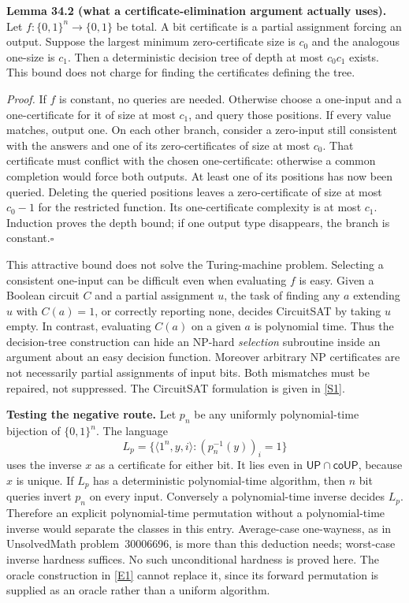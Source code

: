 \documentclass[11pt,a4paper]{article}
\newcommand{\sref}[2]{\hyperlink{source:#1:#2}{[S#2]}}
\newcommand{\eref}[2]{\hyperlink{extra:#1:#2}{[E#2]}}
\numberwithin{equation}{section}
\begin{document}
\textbf{Lemma 34.2 (what a certificate-elimination argument actually uses).}
Let $f:\{0,1\}^n\to\{0,1\}$ be total. A bit certificate is a partial
assignment forcing an output. Suppose the largest minimum zero-certificate
size is $c_0$ and the analogous one-size is $c_1$. Then a deterministic
decision tree of depth at most $c_0c_1$ exists. This bound does not charge for
finding the certificates defining the tree.

\emph{Proof.} If $f$ is constant, no queries are needed. Otherwise choose
a one-input and a one-certificate for it of size at most $c_1$, and query
those positions. If every value matches, output one. On each other branch,
consider a zero-input still consistent with the answers and one of its
zero-certificates of size at most $c_0$. That certificate must conflict with
the chosen one-certificate: otherwise a common completion would force both
outputs. At least one of its positions has now been queried. Deleting the
queried positions leaves a zero-certificate of size at most $c_0-1$ for the
restricted function. Its one-certificate complexity is at most $c_1$.
Induction proves the depth bound; if one output type disappears, the branch
is constant.\hfill$\square$

This attractive bound does not solve the Turing-machine problem. Selecting
a consistent one-input can be difficult even when evaluating $f$ is easy.
Given a Boolean circuit $C$ and a partial assignment $u$, the task of finding
any $a$ extending $u$ with $C(a)=1$, or correctly reporting none, decides
CircuitSAT by taking $u$ empty. In contrast, evaluating $C(a)$ on a given
$a$ is polynomial time. Thus the decision-tree construction can hide an
NP-hard \emph{selection} subroutine inside an argument about an easy decision
function. Moreover arbitrary NP certificates are not necessarily partial
assignments of input bits. Both mismatches must be repaired, not suppressed.
The CircuitSAT formulation is given in \sref{30006687}{1}.

\medskip
\textbf{Testing the negative route.}
Let $p_n$ be any uniformly polynomial-time bijection of $\{0,1\}^n$.
The language
\[
 L_p=\{\langle1^n,y,i\rangle:(p_n^{-1}(y))_i=1\}
\]
uses the inverse $x$ as a certificate for either bit. It lies even in
$\mathsf{UP}\cap\mathsf{coUP}$, because $x$ is unique. If $L_p$ has a
deterministic polynomial-time algorithm, then $n$ bit queries invert $p_n$
on every input. Conversely a polynomial-time inverse decides $L_p$.
Therefore an explicit polynomial-time permutation without a polynomial-time
inverse would separate the classes in this entry. Average-case one-wayness,
as in UnsolvedMath problem~30006696, is more than this deduction needs; worst-case inverse
hardness suffices. No such unconditional hardness is proved here. The
oracle construction in \eref{30006687}{1} cannot replace it, since its forward
permutation is supplied as an oracle rather than a uniform algorithm.
\end{document}

